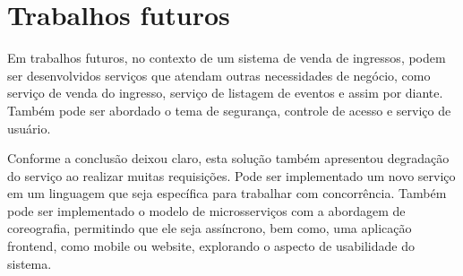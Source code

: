 
\chapter*[Trabalhos futuros]{Trabalhos futuros}\label{trabalhos-futuros}



Em trabalhos futuros,
no contexto de um sistema de venda de ingressos, podem ser desenvolvidos serviços que atendam
outras necessidades de negócio, como serviço de venda do ingresso, serviço de listagem de eventos
e assim por diante.
Também pode ser abordado o tema de segurança, controle de acesso e serviço de usuário.

Conforme a conclusão deixou claro, esta solução também apresentou
degradação do serviço ao realizar muitas requisições.
Pode ser implementado um novo serviço em um linguagem que seja específica para trabalhar
com concorrência.
Também pode ser implementado o modelo de microsserviços com a abordagem de coreografia,
permitindo que ele seja assíncrono, bem como, uma aplicação frontend, como mobile ou website,
explorando o aspecto de usabilidade do sistema.
